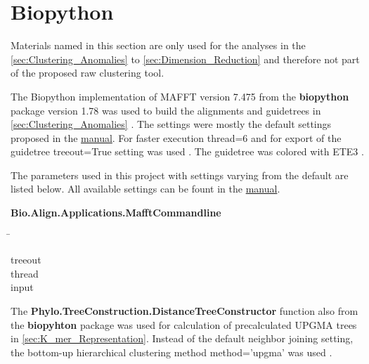 \section{Biopython} \label{sec:MAFFT}

Materials named in this section are only used for the analyses in the \autoref{sec:Clustering_Anomalies} to \autoref{sec:Dimension_Reduction} and therefore not part of the proposed raw clustering tool.

The Biopython implementation of MAFFT version 7.475 from the \textbf{biopython} package version 1.78 was used to build the alignments and guidetrees in \autoref{sec:Clustering_Anomalies} \autocite{katoh_mafft_2013, cock_biopython_2009}. The settings were mostly the default settings proposed in the \href{https://mafft.cbrc.jp/alignment/software/}{manual}. For faster execution \colorbox{backcolour}{thread=6} and for export of the guidetree \colorbox{backcolour}{treeout=True} setting was used \autocite{katoh_mafft_2013, cock_biopython_2009}. The guidetree was colored with ETE3 \autocite{huerta-cepas_ete_2016}. 

The parameters used in this project with settings varying from the default are listed below. All available settings can be fount in the \href{https://mafft.cbrc.jp/alignment/software/}{manual}.

\begin{leftbar}
    \textbf{Bio.Align.Applications.MafftCommandline}
    \begin{nstabbing}
        \qquad\qquad\qquad\qquad\qquad\quad\=\kill
    
        treeout \\
        
        thread \\
        
        input 
        
    \end{nstabbing}
\end{leftbar}

The \textbf{Phylo.TreeConstruction.DistanceTreeConstructor} function also from the \textbf{biopyhton} package was used for calculation of precalculated UPGMA trees in \autoref{sec:K_mer_Representation}. Instead of the default neighbor joining setting, the bottom-up hierarchical clustering method \colorbox{backcolour}{method='upgma'} was used \autocite{gower_minimum_1969, cock_biopython_2009}. 

